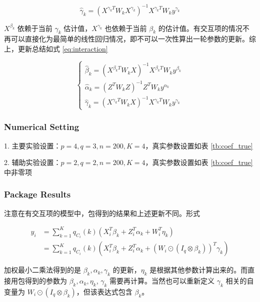 \documentclass[12pt, a4paper, oneside]{article}
\numberwithin{equation}{section}
\begin{document}
\begin{equation}
	\hat \gamma_k = (X^{\gamma_k T} W_k X^{\gamma_k})^{-1} X^{\gamma_k T} W_k y^{\gamma_k}
\end{equation} 

$X^{\beta_k}$ 依赖于当前 $\gamma_k$ 估计值，$X^{\gamma_k}$ 也依赖于当前 $\beta_k$ 的估计值。有交互项的情况不再可以直接化为最简单的线性回归情况，即不可以一次性算出一轮参数的更新。综上，更新总结如式 \ref{eq:interaction}


\begin{equation}
	\left\{\begin{array}{l}
		\hat{\beta}_{k} = (X^{\beta_k T} W_k X)^{-1} X^{\beta_k T} W_k y^{\beta_k}\\
		\hat{\alpha}_{k} = (Z^T W_k Z)^{-1}Z^T W_k y^{\alpha_k}\\
		\hat{\gamma}_{k} = (X^{\gamma_k T} W_k X)^{-1} X^{\gamma_k T} W_k y^{\gamma_k}
	\end{array}\right.
	\label{eq:interaction}
\end{equation}

\subsubsection{Numerical Setting}

1. 主要实验设置：$p=4,q=3,n=200,K=4$，真实参数设置如表 \ref{tb:coef_true} 

2. 辅助实验设置：$p=2,q=2,n=200,K=4$，真实参数设置如表 \ref{tb:coef_true} 中非零项

\subsubsection{Package Results}

注意在有交互项的模型中，包得到的结果和上述更新不同。形式 

\begin{equation}
	\begin{aligned}
		y_i &= \displaystyle\sum_{k=1}^{K} q_{C_i}(k) \left(X_i^T \beta_k + Z_i^T \alpha_k + W_i^T \eta_k\right) \\
		&= \displaystyle\sum_{k=1}^{K} q_{C_i}(k) \left(X_i^T \beta_k + Z_i^T \alpha_k + (W_i \odot (I_q \otimes \beta_k))^T \gamma_k\right)
	\end{aligned}
\end{equation}

加权最小二乘法得到的是 $\beta_k, \alpha_k, \gamma_k$ 的更新，$\eta_k$ 是根据其他参数计算出来的。而直接用包得到的参数为 $\beta_k, \alpha_k, \eta_k$, $\gamma_k$ 需要再计算。当然也可以重新定义 $\gamma_k$ 相关的自变量为 $W_i \odot (I_q \otimes \beta_k)$，但该表达式包含 $\beta_k$。
\end{document}
